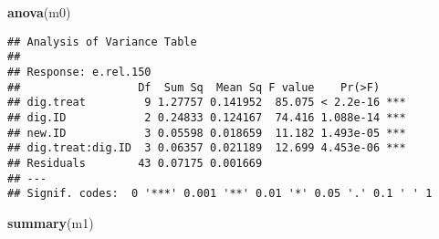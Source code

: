 \documentclass[
]{article}
\newenvironment{Shaded}{\begin{snugshade}}{\end{snugshade}}
\newcommand{\FunctionTok}[1]{\textcolor[rgb]{0.13,0.29,0.53}{\textbf{#1}}}
\newcommand{\NormalTok}[1]{#1}
\begin{document}
\begin{Shaded}
\begin{Highlighting}[]
\FunctionTok{anova}\NormalTok{(m0)}
\end{Highlighting}
\end{Shaded}

\begin{verbatim}
## Analysis of Variance Table
## 
## Response: e.rel.150
##                  Df  Sum Sq  Mean Sq F value    Pr(>F)    
## dig.treat         9 1.27757 0.141952  85.075 < 2.2e-16 ***
## dig.ID            2 0.24833 0.124167  74.416 1.088e-14 ***
## new.ID            3 0.05598 0.018659  11.182 1.493e-05 ***
## dig.treat:dig.ID  3 0.06357 0.021189  12.699 4.453e-06 ***
## Residuals        43 0.07175 0.001669                      
## ---
## Signif. codes:  0 '***' 0.001 '**' 0.01 '*' 0.05 '.' 0.1 ' ' 1
\end{verbatim}

\begin{Shaded}
\begin{Highlighting}[]
\FunctionTok{summary}\NormalTok{(m1)}
\end{Highlighting}
\end{Shaded}
\end{document}
